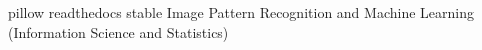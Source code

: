 \begin{thebibliography}{99}
    pillow readthedocs stable Image
    Pattern Recognition and Machine Learning (Information Science and Statistics)
\end{thebibliography}
